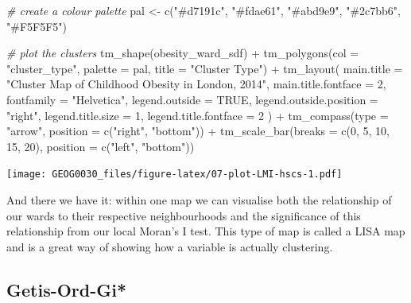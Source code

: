 \documentclass[
]{book}
\newenvironment{Shaded}{\begin{snugshade}}{\end{snugshade}}
\newcommand{\AttributeTok}[1]{\textcolor[rgb]{0.77,0.63,0.00}{#1}}
\newcommand{\CommentTok}[1]{\textcolor[rgb]{0.56,0.35,0.01}{\textit{#1}}}
\newcommand{\ConstantTok}[1]{\textcolor[rgb]{0.00,0.00,0.00}{#1}}
\newcommand{\DecValTok}[1]{\textcolor[rgb]{0.00,0.00,0.81}{#1}}
\newcommand{\FunctionTok}[1]{\textcolor[rgb]{0.00,0.00,0.00}{#1}}
\newcommand{\NormalTok}[1]{#1}
\newcommand{\OtherTok}[1]{\textcolor[rgb]{0.56,0.35,0.01}{#1}}
\newcommand{\SpecialCharTok}[1]{\textcolor[rgb]{0.00,0.00,0.00}{#1}}
\newcommand{\StringTok}[1]{\textcolor[rgb]{0.31,0.60,0.02}{#1}}
\begin{document}
\begin{Shaded}
\begin{Highlighting}[]
\CommentTok{\# create a colour palette}
\NormalTok{pal }\OtherTok{\textless{}{-}} \FunctionTok{c}\NormalTok{(}\StringTok{"\#d7191c"}\NormalTok{, }\StringTok{"\#fdae61"}\NormalTok{, }\StringTok{"\#abd9e9"}\NormalTok{, }\StringTok{"\#2c7bb6"}\NormalTok{, }\StringTok{"\#F5F5F5"}\NormalTok{)}

\CommentTok{\# plot the clusters}
\FunctionTok{tm\_shape}\NormalTok{(obesity\_ward\_sdf) }\SpecialCharTok{+}
  \FunctionTok{tm\_polygons}\NormalTok{(}\AttributeTok{col =} \StringTok{"cluster\_type"}\NormalTok{, }\AttributeTok{palette =}\NormalTok{ pal, }\AttributeTok{title =} \StringTok{"Cluster Type"}\NormalTok{) }\SpecialCharTok{+}
  \FunctionTok{tm\_layout}\NormalTok{(}
    \AttributeTok{main.title =} \StringTok{"Cluster Map of Childhood Obesity in London, 2014"}\NormalTok{,}
    \AttributeTok{main.title.fontface =} \DecValTok{2}\NormalTok{, }\AttributeTok{fontfamily =} \StringTok{"Helvetica"}\NormalTok{, }\AttributeTok{legend.outside =} \ConstantTok{TRUE}\NormalTok{,}
    \AttributeTok{legend.outside.position =} \StringTok{"right"}\NormalTok{,}
    \AttributeTok{legend.title.size =} \DecValTok{1}\NormalTok{,}
    \AttributeTok{legend.title.fontface =} \DecValTok{2}
\NormalTok{  ) }\SpecialCharTok{+}
  \FunctionTok{tm\_compass}\NormalTok{(}\AttributeTok{type =} \StringTok{"arrow"}\NormalTok{, }\AttributeTok{position =} \FunctionTok{c}\NormalTok{(}\StringTok{"right"}\NormalTok{, }\StringTok{"bottom"}\NormalTok{)) }\SpecialCharTok{+}
  \FunctionTok{tm\_scale\_bar}\NormalTok{(}\AttributeTok{breaks =} \FunctionTok{c}\NormalTok{(}\DecValTok{0}\NormalTok{, }\DecValTok{5}\NormalTok{, }\DecValTok{10}\NormalTok{, }\DecValTok{15}\NormalTok{, }\DecValTok{20}\NormalTok{), }\AttributeTok{position =} \FunctionTok{c}\NormalTok{(}\StringTok{"left"}\NormalTok{, }\StringTok{"bottom"}\NormalTok{))}
\end{Highlighting}
\end{Shaded}

\texttt{[image: GEOG0030\_files/figure-latex/07-plot-LMI-hscs-1.pdf]}

And there we have it: within one map we can visualise both the relationship of our wards to their respective neighbourhoods and the significance of this relationship from our local Moran's I test. This type of map is called a LISA map and is a great way of showing how a variable is actually clustering.

\hypertarget{getis-ord-gi}{%
\subsection{Getis-Ord-Gi*}\label{getis-ord-gi}}
\end{document}
